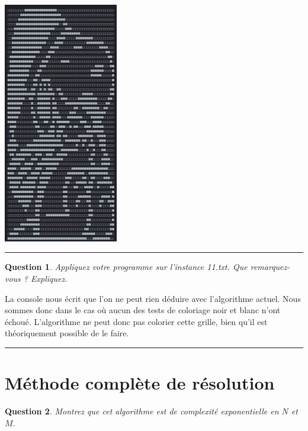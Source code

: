 \documentclass[a4paper,12pt]{article}
\newtheorem{exo}{Question}
\begin{document}
\begin{center}\includegraphics[width=5cm]{instance9.png}\end{center}

\noindent\rule{\textwidth}{1pt}


\begin{exo}
	Appliquez votre programme sur l'instance 11.txt. Que remarquez-vous ? Expliquez.
\end{exo}

La console nous écrit que l'on ne peut rien déduire avec l'algorithme actuel. Nous sommes donc dans le cas où aucun des tests de coloriage noir et blanc n'ont échoué. L'algorithme ne peut donc pas colorier cette grille, bien qu'il est théoriquement possible de le faire.

\noindent\rule{\textwidth}{1pt}

\newpage


\section{Méthode complète de résolution}


\begin{exo}
	Montrez que cet algorithme est de complexité exponentielle en $N$ et $M$.
\end{exo}
\end{document}
